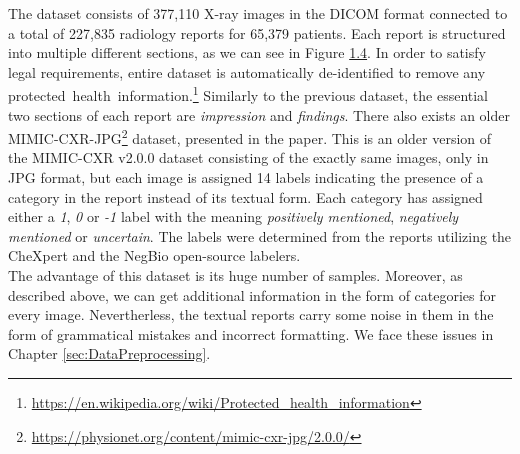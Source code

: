 The dataset consists of 377,110 X-ray images in the DICOM format connected to a total of 227,835 radiology reports for 65,379 patients. Each report is structured into multiple different sections, as we can see in Figure \hyperref[fig04:MimicCXRSample]{1.4}. In order to satisfy legal requirements, entire dataset is automatically de-identified to remove any protected~health~information.\footnote[9]{\url{https://en.wikipedia.org/wiki/Protected\_health\_information}} Similarly to the previous dataset, the essential two sections of each report are \textit{impression} and \textit{findings}. There also exists an older MIMIC-CXR-JPG\footnote[10]{\url{https://physionet.org/content/mimic-cxr-jpg/2.0.0/}} dataset, presented in the \citet{cxr-jpg:johnson2019mimic} paper. This is an older version of the MIMIC-CXR v2.0.0 dataset consisting of the exactly same images, only in JPG format, but each image is assigned 14 labels indicating the presence of a category in the report instead of its textual form. Each category has assigned either a \textit{1}, \textit{0} or \textit{-1} label with the meaning \textit{positively mentioned}, \textit{negatively mentioned} or \textit{uncertain}. The labels were determined from the reports utilizing the CheXpert\citep{irvin2019chexpert} and the NegBio\citep{peng2018negbio} open-source labelers.\\

The advantage of this dataset is its huge number of samples. Moreover, as described above, we can get additional information in the form of categories for every image. Nevertherless, the textual reports carry some noise in them in the form of grammatical mistakes and incorrect formatting. We face these issues in Chapter \ref{sec:DataPreprocessing}. 

